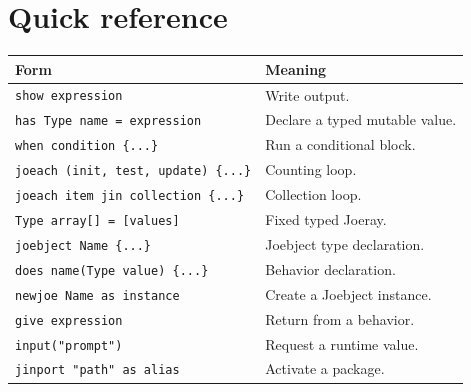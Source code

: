 \documentclass[11pt]{article}
\newcommand{\keyword}[1]{\texttt{#1}}
\begin{document}
\section{Quick reference}
\begin{longtable}{p{}p{}}
\toprule
\textbf{Form} & \textbf{Meaning} \\
\midrule
\endhead
\keyword{show expression} & Write output. \\
\keyword{has Type name = expression} & Declare a typed mutable value. \\
\keyword{when condition \{...\}} & Run a conditional block. \\
\keyword{joeach (init, test, update) \{...\}} & Counting loop. \\
\keyword{joeach item jin collection \{...\}} & Collection loop. \\
\keyword{Type array[] = [values]} & Fixed typed Joeray. \\
\keyword{joebject Name \{...\}} & Joebject type declaration. \\
\keyword{does name(Type value) \{...\}} & Behavior declaration. \\
\keyword{newjoe Name as instance} & Create a Joebject instance. \\
\keyword{give expression} & Return from a behavior. \\
\keyword{input("prompt")} & Request a runtime value. \\
\keyword{jinport "path" as alias} & Activate a package. \\
\bottomrule
\end{longtable}
\end{document}
